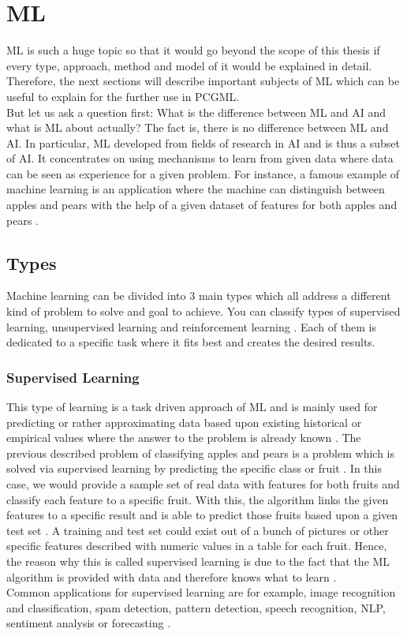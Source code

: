 \documentclass[MGS,Master,english]{twbook}%
\begin{document}
\chapter{\acl{ML}}
\ac{ML} is such a huge topic so that it would go beyond the scope of this thesis if every type, approach, method and model of it would be explained in detail. Therefore, the next sections will describe important subjects of ML which can be useful to explain for the further use in PCGML. \\
But let us ask a question first: What is the difference between ML and AI and what is ML about actually? The fact is, there is no difference between ML and AI. In particular, ML developed from fields of research in AI and is thus a subset of AI. It concentrates on using mechanisms to learn from given data where data can be seen as experience for a given problem. For instance, a famous example of machine learning is an application where the machine can distinguish between apples and pears with the help of a given dataset of features for both apples and pears \cite{ai::book}. 

\section{Types}
Machine learning can be divided into 3 main types which all address a different kind of problem to solve and goal to achieve. You can classify types of supervised learning, unsupervised learning and reinforcement learning \cite{ml::book::developer}. Each of them is dedicated to a specific task where it fits best and creates the desired results.

\subsection{Supervised Learning}
This type of learning is a task driven approach of ML and is mainly used for predicting or rather approximating data based upon existing historical or empirical values where the answer to the problem is already known \cite{ml::book::developer} \cite{ai::book}. The previous described problem of classifying apples and pears is a problem which is solved via supervised learning by predicting the specific class or fruit \cite{ml::book::developer}. In this case, we would provide a sample set of real data with features for both fruits and classify each feature to a specific fruit. With this, the algorithm links the given features to a specific result and is able to predict those fruits based upon a given test set \cite{ml::book::developer}. A training and test set could exist out of a bunch of pictures or other specific features described with numeric values in a table for each fruit. Hence, the reason why this is called supervised learning is due to the fact that the ML algorithm is provided with data and therefore knows what to learn \cite{ai::book}.\\
Common applications for supervised learning are for example, image recognition and classification, spam detection, pattern detection, speech recognition, \ac{NLP}, sentiment analysis or forecasting \cite{ml::book::algorithms}.
\end{document}
